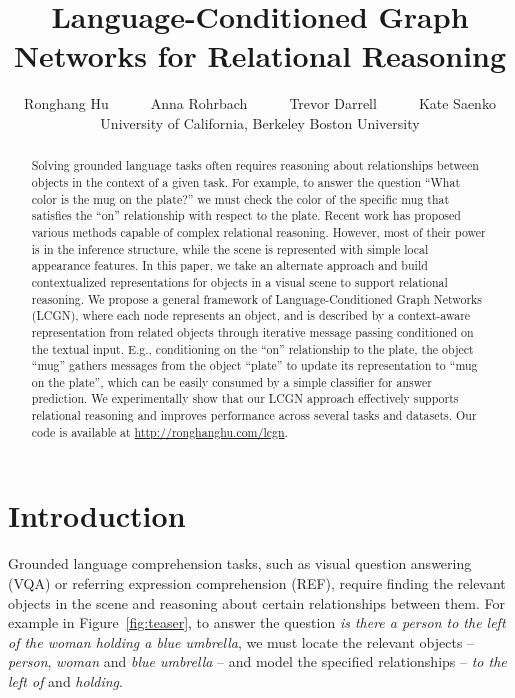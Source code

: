 \documentclass[10pt,twocolumn,letterpaper]{article}
\begin{document}
\title{Language-Conditioned Graph Networks for Relational Reasoning}

\author{Ronghang Hu~~~~~~Anna Rohrbach~~~~~~Trevor Darrell~~~~~~Kate Saenko \\
University of California, Berkeley  Boston University \\
}

\maketitle


\begin{abstract}
Solving grounded language tasks often requires reasoning about relationships between objects in the context of a given task. For example, to answer the question ``What color is the mug on the plate?'' we must check the color of the specific mug that satisfies the ``on'' relationship with respect to the plate. Recent work has proposed various methods capable of complex relational reasoning. However, most of their power is in the inference structure, while the scene is represented with simple local appearance features. In this paper, we take an alternate approach and build contextualized representations for objects in a visual scene to support relational reasoning. We propose a general framework of Language-Conditioned Graph Networks (LCGN), where each node represents an object, and is described by a context-aware representation from related objects through iterative message passing conditioned on the textual input. E.g., conditioning on the ``on'' relationship to the plate, the object ``mug'' gathers messages from the object ``plate'' to update its representation to ``mug on the plate'', which can be easily consumed by a simple classifier for answer prediction. We experimentally show that our LCGN approach effectively supports relational reasoning and improves performance across several tasks and datasets. Our code is available at \url{http://ronghanghu.com/lcgn}.
\vspace{-1em}
 \end{abstract}

\section{Introduction}
\label{sec:intro}

Grounded language comprehension tasks, such as visual question answering (VQA) or referring expression comprehension (REF), require finding the relevant objects in the scene and reasoning about certain relationships between them. For example in Figure~\ref{fig:teaser}, to answer the question \textit{is there a person to the left of the woman holding a blue umbrella}, we must locate the relevant objects -- \textit{person}, \textit{woman} and \textit{blue umbrella} -- and model the specified relationships -- \textit{to the left of} and \textit{holding}.
\end{document}
